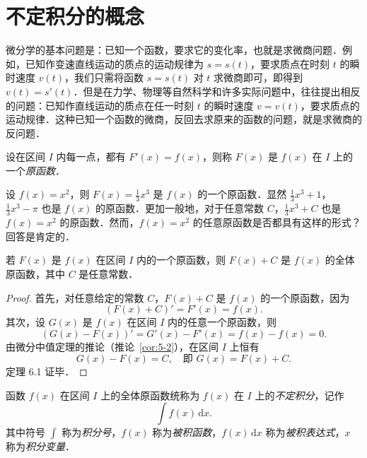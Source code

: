\section{不定积分的概念}\label{sec:6.1}

微分学的基本问题是：已知一个函数，要求它的变化率，也就是求微商问题．例如，已知作变速直线运动的质点的运动规律为 $s = s(t)$，要求质点在时刻 $t$ 的瞬时速度 $v(t)$，我们只需将函数 $s = s(t)$ 对 $t$ 求微商即可，即得到 $v(t) = s'(t)$．但是在力学、物理等自然科学和许多实际问题中，往往提出相反的问题：已知作直线运动的质点在任一时刻 $t$ 的瞬时速度 $v = v(t)$，要求质点的运动规律．这种已知一个函数的微商，反回去求原来的函数的问题，就是求微商的反问题．

\begin{definition}\label{def:6-1}
设在区间 $I$ 内每一点，都有 $F'(x) = f(x)$，则称 $F(x)$ 是 $f(x)$ 在 $I$ 上的一个\emph{原函数}．
\end{definition}

\begin{example}
设 $f(x)=x^2$，则 $F(x)=\frac{1}{3}x^3$ 是 $f(x)$ 的一个原函数．显然 $\frac{1}{3}x^3+1$，$\frac{1}{3}x^3-\pi$ 也是 $f(x)$ 的原函数．更加一般地，对于任意常数 $C$，$\frac{1}{3}x^3+C$ 也是 $f(x)=x^2$ 的原函数．然而，$f(x)=x^2$ 的任意原函数是否都具有这样的形式？回答是肯定的．
\end{example}

\begin{theorem}\label{thm:6-1}
若 $F(x)$ 是 $f(x)$ 在区间 $I$ 内的一个原函数，则 $F(x) + C$ 是 $f(x)$ 的全体原函数，其中 $C$ 是任意常数．
\end{theorem}

\begin{proof}
首先，对任意给定的常数 $C$，$F(x) + C$ 是 $f(x)$ 的一个原函数，因为
\[
(F(x) + C)' = F'(x) = f(x).
\]
其次，设 $G(x)$ 是 $f(x)$ 在区间 $I$ 内的任意一个原函数，则
\[
(G(x) - F(x))' = G'(x) - F'(x) = f(x) - f(x) = 0.
\]
由微分中值定理的推论（推论~\ref{cor:5-2}），在区间 $I$ 上恒有
\[
G(x) - F(x) = C,\quad \text{即 } G(x) = F(x) + C.
\]
定理 6.1 证毕．
\end{proof}

\begin{definition}\label{def:6-2}
函数 $f(x)$ 在区间 $I$ 上的全体原函数统称为 $f(x)$ 在 $I$ 上的\emph{不定积分}，记作
\[
\int f(x)\,\mathrm{d}x.
\]
其中符号 $\int$ 称为\emph{积分号}，$f(x)$ 称为\emph{被积函数}，$f(x)\,\mathrm{d}x$ 称为\emph{被积表达式}，$x$ 称为\emph{积分变量}．
\end{definition}

